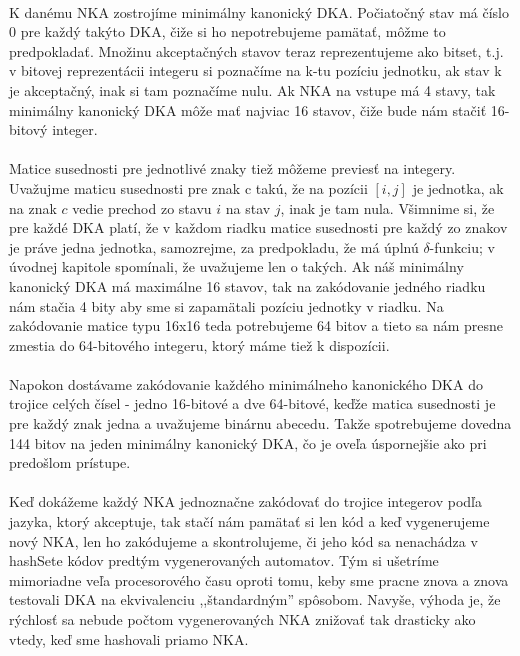 \paragraph{}
K danému NKA zostrojíme minimálny kanonický DKA. Počiatočný stav má číslo 0 pre každý takýto DKA, čiže si ho nepotrebujeme pamätať, môžme to predpokladať. Množinu akceptačných stavov teraz reprezentujeme ako bitset, t.j. v bitovej reprezentácii integeru si poznačíme na k-tu pozíciu jednotku, ak stav k je akceptačný, inak si tam poznačíme nulu. Ak NKA na vstupe má 4 stavy, tak minimálny kanonický DKA môže mať najviac 16 stavov, čiže bude nám stačiť 16-bitový integer. 
\paragraph{}
Matice susednosti pre jednotlivé znaky tiež môžeme previesť na integery. Uvažujme maticu susednosti pre znak c takú, že na pozícii $[i,j]$ je jednotka, ak na znak $c$ vedie prechod zo stavu $i$ na stav $j$, inak je tam nula. Všimnime si, že pre každé DKA platí, že v každom riadku matice susednosti pre každý zo znakov je práve jedna jednotka, samozrejme, za predpokladu, že má úplnú $\delta$-funkciu; v úvodnej kapitole spomínali, že uvažujeme len o takých. Ak náš minimálny kanonický DKA má maximálne 16 stavov, tak na zakódovanie jedného riadku nám stačia 4 bity aby sme si zapamätali pozíciu jednotky v riadku. Na zakódovanie matice typu 16x16 teda potrebujeme 64 bitov a tieto sa nám presne zmestia do 64-bitového integeru, ktorý máme tiež k dispozícii.
\paragraph{}
Napokon dostávame zakódovanie každého minimálneho kanonického DKA do trojice celých čísel - jedno 16-bitové a dve 64-bitové, keďže matica susednosti je pre každý znak jedna a uvažujeme binárnu abecedu. Takže spotrebujeme dovedna 144 bitov na jeden minimálny kanonický DKA, čo je oveľa úspornejšie ako pri predošlom prístupe.
\paragraph{}
Keď dokážeme každý NKA jednoznačne zakódovať do trojice integerov podľa jazyka, ktorý akceptuje, tak stačí nám pamätať si len kód a keď vygenerujeme nový NKA, len ho zakódujeme a skontrolujeme, či jeho kód sa nenachádza v hashSete kódov predtým vygenerovaných automatov. Tým si ušetríme mimoriadne veľa procesorového času oproti tomu, keby sme pracne znova a znova testovali DKA na ekvivalenciu ,,štandardným'' spôsobom. Navyše, výhoda je, že rýchlosť sa nebude počtom vygenerovaných NKA znižovať tak drasticky ako vtedy, keď sme hashovali priamo NKA.








